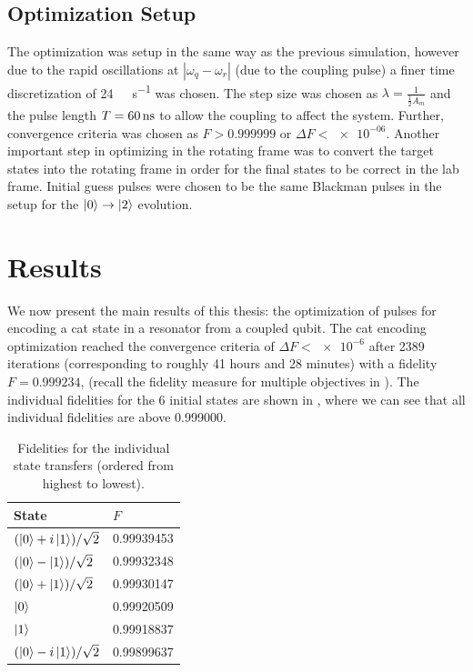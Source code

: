 \documentclass[main.tex]{subfiles}
\begin{document}
\subsection{Optimization Setup}
The optimization was setup in the same way as the previous simulation, however due to the rapid oscillations at \(|\omega_q-\omega_r|\) (due to the coupling pulse) a finer time discretization of \SI{24}{\giga\samples\per\second} was chosen.
The step size was chosen as \(\lambda = \frac{1}{\frac{1}{2}A_{m}}\) and the pulse length \(T = \SI{60}{\nano\second}\) to allow the coupling to affect the system.
Further, convergence criteria was chosen as \(F>0.999999\) or \(\Delta F < \num{e-06}\).
Another important step in optimizing in the rotating frame was to convert the target states into the rotating frame in order for the final states to be correct in the lab frame.
Initial guess pulses were chosen to be the same Blackman pulses in the setup for the \(\ket{0}\rightarrow\ket{2}\) evolution.

\section{Results}
We now present the main results of this thesis: the optimization of pulses for encoding a cat state in a resonator from a coupled qubit.
The cat encoding optimization reached the convergence criteria of \(\Delta F < \num{e-6}\) after 2389 iterations (corresponding to roughly 41 hours and 28 minutes) with a fidelity \(F = 0.999234\), (recall the fidelity measure for multiple objectives in ).
The individual fidelities for the 6 initial states are shown in , where we can see that all individual fidelities are above 0.999000.

\begin{table}[ht]
    \caption{Fidelities for the individual state transfers (ordered from highest to lowest).}%
    \label{tab:cat-fidelities}
    \centering
    \begin{tabular}{@{}ll@{}}
    \toprule
    State & \(F\)\\ \midrule
	\((\ket{0}+i\ket{1})/\sqrt{2}\) & 0.99939453 \\
	\((\ket{0}-\ket{1})/\sqrt{2}\) & 0.99932348 \\
	\((\ket{0}+\ket{1})/\sqrt{2}\) & 0.99930147 \\
    \(\ket{0}\) & 0.99920509 \\
	\(\ket{1}\) & 0.99918837 \\
	\((\ket{0}-i\ket{1})/\sqrt{2}\) & 0.99899637 \\
    \bottomrule
    \end{tabular}
\end{table}
\end{document}
